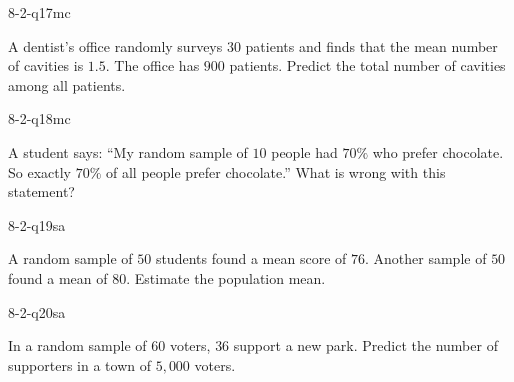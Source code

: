 \begin{practiceQuestion}{8-2-q17}{mc}
\begin{questionText}
A dentist's office randomly surveys $30$ patients and finds that the mean number of cavities is $1.5$. The office has $900$ patients. Predict the total number of cavities among all patients.
\end{questionText}
\end{practiceQuestion}

\begin{practiceQuestion}{8-2-q18}{mc}
\begin{questionText}
A student says: ``My random sample of $10$ people had $70\%$ who prefer chocolate. So exactly $70\%$ of all people prefer chocolate.'' What is wrong with this statement?
\end{questionText}
\end{practiceQuestion}


\begin{practiceQuestion}{8-2-q19}{sa}
\begin{questionText}
A random sample of $50$ students found a mean score of $76$. Another sample of $50$ found a mean of $80$. Estimate the population mean.
\end{questionText}
\end{practiceQuestion}

\begin{practiceQuestion}{8-2-q20}{sa}
\begin{questionText}
In a random sample of $60$ voters, $36$ support a new park. Predict the number of supporters in a town of $5{,}000$ voters.
\end{questionText}
\end{practiceQuestion}

